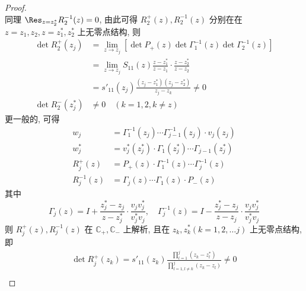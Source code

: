 \begin{proof}
\begin{equation}
    \end{equation}
    同理 $ \Res_{z = z_{2}^{*}} R_{2}^{-1}(z) = 0 $, 由此可得 $ R_{2}^{+}(z), R_{2}^{-1}(z) $ 分别在在 $ z=z_{1}, z_{2}, z=z_{1}^{*}, z_{2}^{*} $ 上无零点结构, 则
    \begin{equation}
        \begin{aligned}
            \det R_{2}^{+}(z_{j})     & = \lim_{z \to z_{j}} \left[ \det P_{+}(z) \det \Gamma_{1}^{-1}(z) \det \Gamma_{2}^{-1}(z)\right]     \\
                                      & = \lim_{z \to z_{j}} S_{11}(z) \frac{z - z_{1}^{*}}{z - z_{1}} \cdot \frac{z - z_{2}^{*}}{z - z_{2}} \\
                                      & = s'_{11}(z_{j}) \frac{(z_{j} - z_{1}^{*})(z_{j} - z_{2}^{*})}{z_{j} - z_{k}} \neq 0                 \\
            \det R_{2}^{-}(z_{j}^{*}) & \neq 0 \quad (k = 1, 2, k \neq z)
        \end{aligned}
    \end{equation}
    更一般的, 可得
    \begin{equation}
        \begin{aligned}
            w_{j}         & = \Gamma_{1}^{-1}(z_{j}) \cdots \Gamma_{j-1}^{-1}(z_{j}) \cdot v_{j}(z_{j})       \\
            w_{j}^{*}     & = v_{j}^{*}(z_{j}^{*}) \cdot \Gamma_{1}(z_{j}^{*}) \cdots \Gamma_{j-1}(z_{j}^{*}) \\
            R_{j}^{+}(z)  & = P_{+}(z) \cdot \Gamma_{1}^{-1}(z) \cdots \Gamma_{j}^{-1}(z)                     \\
            R_{j}^{-1}(z) & = \Gamma_{j}(z) \cdots \Gamma_{1}(z) \cdot P_{-}(z)
        \end{aligned}
    \end{equation}
    其中
    \begin{equation}
        \Gamma_{j}(z) = I + \frac{z_{j}^{*} - z_{j}}{z - z_{j}^{*}} \cdot \frac{v_{j}v_{j}^{*}}{v_{j}^{*}v_{j}}, \quad \Gamma_{j}^{-1}(z) = I - \frac{z_{j}^{*} - z_{j}}{z - z_{j}} \cdot \frac{v_{j}v_{j}^{*}}{v_{j}^{*}v_{j}} \label{ch2-eq-Gamma-j}
    \end{equation}
    则 $ R_{j}^{+}(z), R_{j}^{-1}(z) $ 在 $ \mathbb{C_{+}}, \mathbb{C_{-}} $ 上解析, 且在 $ z_{k}, z_{k}^{*} (k = 1,2, \ldots j) $ 上无零点结构, 即
    \begin{equation}
        \begin{aligned}
            \det R_{j}^{+}(z_{k}) = s'_{11}(z_{k}) \frac{\prod_{l = 1}^{j}(z_{k} - z_{l}^{*})}{\prod_{l = 1, l \neq k }^{j}(z_{k} - z_{l})} \neq 0 \\

\end{aligned}
\end{equation}
\end{proof}
